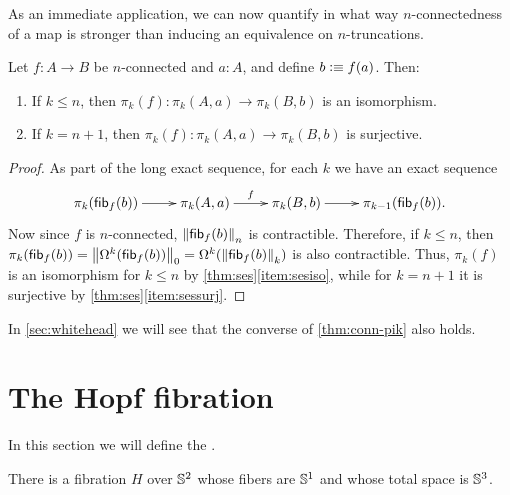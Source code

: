 As an immediate application, we can now quantify in what way $n$-connectedness of a map is stronger than inducing an equivalence on $n$-truncations.

\begin{cor}\label{thm:conn-pik}
  Let $f:A\to B$ be $n$-connected and $a:A$, and define $b\defeq f(a)$.  Then:
  \begin{enumerate}
  \item If $k\le n$, then $\pi_k(f):\pi_k(A,a) \to \pi_k(B,b)$ is an isomorphism.
  \item If $k=n+1$, then $\pi_k(f):\pi_k(A,a) \to \pi_k(B,b)$ is surjective.
  \end{enumerate}
\end{cor}
\begin{proof}
  As part of the long exact sequence, for each $k$ we have an exact sequence
  \[\xymatrix{\pi_k(\hfib f b) \ar[r]& \pi_k(A,a) \ar^f[r] & \pi_k(B,b) \ar[r] & \pi_{k-1}(\hfib f b).}\]
  Now since $f$ is $n$-connected, $\trunc n{\hfib f b}$ is contractible.
  Therefore, if $k\le n$, then $\pi_k(\hfib f b) = \trunc0{\Omega^k(\hfib f b)} = \Omega^k(\trunc k{\hfib f b})$ is also contractible.
  Thus, $\pi_k(f)$ is an isomorphism for $k\le n$ by \autoref{thm:ses}\ref{item:sesiso}, while for $k=n+1$ it is surjective by \autoref{thm:ses}\ref{item:sessurj}.
\end{proof}

In \autoref{sec:whitehead} we will see that the converse of \autoref{thm:conn-pik} also holds.


\section{The Hopf fibration}
\label{sec:hopf}

In this section we will define the .

\begin{thm}
There is a fibration $H$ over $\Sn ^2$ whose fibers are $\Sn ^1$ and
whose total space is $\Sn ^3$.
\end{thm}

